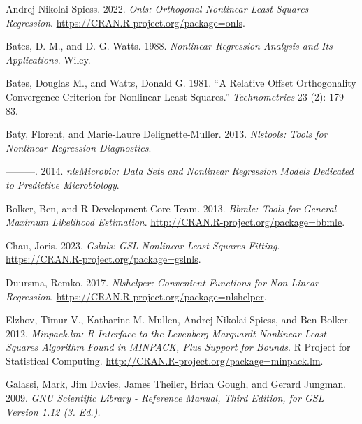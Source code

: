 \hypertarget{refs}{}
\begin{CSLReferences}{1}{0}
\leavevmode{}%
Andrej-Nikolai Spiess. 2022. \emph{Onls: Orthogonal Nonlinear Least-Squares Regression}. \url{https://CRAN.R-project.org/package=onls}.

\leavevmode{}%
Bates, D. M., and D. G. Watts. 1988. \emph{Nonlinear Regression Analysis and Its Applications}. Wiley.

\leavevmode{}%
Bates, Douglas M., and Watts, Donald G. 1981. {``A Relative Offset Orthogonality Convergence Criterion for Nonlinear Least Squares.''} \emph{Technometrics} 23 (2): 179--83.

\leavevmode{}%
Baty, Florent, and Marie-Laure Delignette-Muller. 2013. \emph{Nlstools: Tools for Nonlinear Regression Diagnostics}.

\leavevmode{}%
---------. 2014. \emph{nlsMicrobio: Data Sets and Nonlinear Regression Models Dedicated to Predictive Microbiology}.

\leavevmode{}%
Bolker, Ben, and R Development Core Team. 2013. \emph{Bbmle: Tools for General Maximum Likelihood Estimation}. \url{http://CRAN.R-project.org/package=bbmle}.

\leavevmode{}%
Chau, Joris. 2023. \emph{Gslnls: GSL Nonlinear Least-Squares Fitting}. \url{https://CRAN.R-project.org/package=gslnls}.

\leavevmode{}%
Duursma, Remko. 2017. \emph{Nlshelper: Convenient Functions for Non-Linear Regression}. \url{https://CRAN.R-project.org/package=nlshelper}.

\leavevmode{}%
Elzhov, Timur V., Katharine M. Mullen, Andrej-Nikolai Spiess, and Ben Bolker. 2012. \emph{Minpack.lm: R Interface to the Levenberg-Marquardt Nonlinear Least-Squares Algorithm Found in MINPACK, Plus Support for Bounds}. R Project for Statistical Computing. \url{http://CRAN.R-project.org/package=minpack.lm}.

\leavevmode{}%
Galassi, Mark, Jim Davies, James Theiler, Brian Gough, and Gerard Jungman. 2009. \emph{GNU Scientific Library - Reference Manual, Third Edition, for GSL Version 1.12 (3. Ed.).}


\end{CSLReferences}
